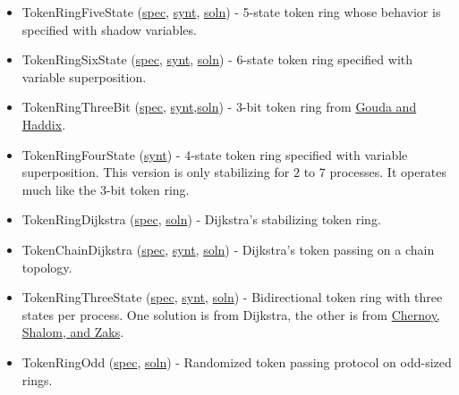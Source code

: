 \begin{itemize}
\item TokenRingFiveState (\href{\examplespec/TokenRing.prot}{spec}, \href{\examplesynt/TokenRing.prot}{synt}, \href{\examplesoln/TokenRingFiveState.prot}{soln})
- 5-state token ring whose behavior is specified with shadow variables.
\item TokenRingSixState (\href{\examplespec/TokenRingSuperpos.prot}{spec}, \href{\examplesynt/TokenRingSuperpos.prot}{synt}, \href{\examplesoln/TokenRingSixState.prot}{soln})
- 6-state token ring specified with variable superposition.
\item TokenRingThreeBit (\href{\examplespec/TokenRingThreeBit.prot}{spec}, \href{\examplesynt/TokenRingThreeBit.prot}{synt},\href{\examplesoln/TokenRingThreeBit.prot}{soln})
- 3-bit token ring from \href{http://dx.doi.org/10.1006/jpdc.1996.0066}{Gouda and Haddix}.
\item TokenRingFourState (\href{\examplesynt/TokenRingFourState.prot}{synt})
- 4-state token ring specified with variable superposition.
This version is only stabilizing for $2$ to $7$ processes.
It operates much like the 3-bit token ring.
\item TokenRingDijkstra (\href{\examplespec/TokenRingDijkstra.prot}{spec}, \href{\examplesoln/TokenRingDijkstra.prot}{soln})
- Dijkstra's stabilizing token ring.
\item TokenChainDijkstra (\href{\examplespec/TokenChainDijkstra.prot}{spec}, \href{\examplesynt/TokenChainDijkstra.prot}{synt}, \href{\examplesoln/TokenChainDijkstra.prot}{soln})
- Dijkstra's token passing on a chain topology.
\item TokenRingThreeState (\href{\examplespec/TokenRingThreeState.prot}{spec}, \href{\examplesynt/TokenRingThreeState.prot}{synt}, \href{\examplesoln/TokenRingThreeState.prot}{soln})
- Bidirectional token ring with three states per process.
One solution is from Dijkstra, the other is from \href{http://citeseerx.ist.psu.edu/viewdoc/summary?doi=10.1.1.153.6017}{Chernoy, Shalom, and Zaks}.
\item TokenRingOdd (\href{\examplespec/TokenRingOdd.prot}{spec}, \href{\examplesoln/TokenRingOdd.prot}{soln})
- Randomized token passing protocol on odd-sized rings.
\end{itemize}


